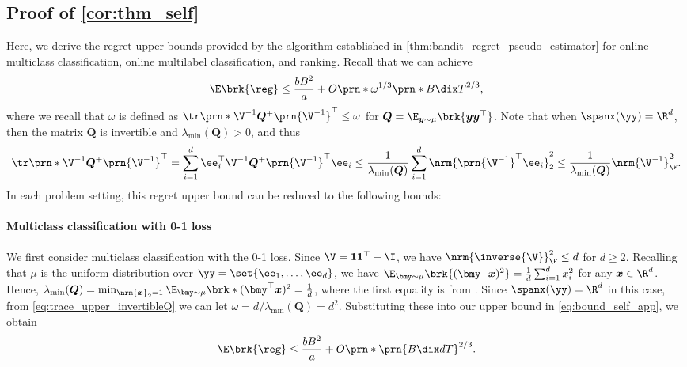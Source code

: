 \subsection{Proof of \cref{cor:thm_self}}\label{app:SELF_upper_discussion_deferred}
Here, we derive the regret upper bounds provided by the algorithm established  
in \cref{thm:bandit_regret_pseudo_estimator}  
for online multiclass classification, online multilabel classification, and ranking.
Recall that 
we can achieve
\begin{equation}\label{eq:bound_self_app}
\E\brk{\reg}
\leq
\frac{bB^2}{a}
+
O\prn*{ \omega^{1/3} \prn*{ B \dix T}^{2/3} },    
\end{equation}
where we recall that $\omega$ is defined as
$
    \tr \prn*{ \V^{-1} \bm{Q}^+ \prn{\V^{-1}}^\top } \leq \omega
$
for $\bm{Q} = \E_{\bm{y} \sim \mu} \brk{ \bm{y} \bm{y}^\top }$.
Note that when $\spanx(\yy) = \R^d$, then the matrix $\bm{Q}$ is invertible and $\lambda_{\min}(\bm{Q}) > 0$, and thus 
\begin{equation}\label{eq:trace_upper_invertibleQ}
    \tr \prn*{ \V^{-1} \bm{Q}^+ \prn{\V^{-1}}^\top }
    =
    \sum_{i=1}^d
    \bm{\ee}_i^\top \V^{-1} \bm{Q}^+ \prn{\V^{-1}}^\top \bm{\ee}_i
    \leq
    \frac{1}{\lambda_{\min}(\bm{Q})}
    \sum_{i=1}^d
    \nrm{ \prn{\V^{-1}}^\top \bm{\ee}_i }_2^2
    \leq 
    \frac{1}{\lambda_{\min}(\bm{Q})}
    \nrm{ \V^{-1} }_{\F}^2
    .
\end{equation}
In each problem setting, this regret upper bound can be reduced to the following bounds:

\paragraph{Multiclass classification with 0-1 loss}
We first consider multiclass classification with the 0-1 loss.
Since $\V=\bm{1}\bm{1}^\top-\I$, we have $\nrm{\inverse{\V}}_\F^2\leq d$ for $d \geq 2$.  
Recalling that $\mu$ is the uniform distribution over $\yy=\set{\bm{\ee}_1,\hdots,\bm{\ee}_d}$, we have  
$
\E_{\bmy\sim\mu}\brk{(\bmy^\top\bm x)^2}=\frac{1}{d}\sum_{i=1}^{d}x_i^2
$
for any $\bm x\in\R^d$.
Hence, $\lambda_{\min}(\bm{Q})=\min_{\nrm{\bm x}_2=1} \E_{\bmy\sim\mu}\brk*{(\bmy^\top\bm x)^2}=\frac{1}{d}$, where the first equality is from \citet[Lemma 2]{comband}.  
Since $\spanx(\yy) = \R^d$ in this case,
from \eqref{eq:trace_upper_invertibleQ} we can let $\omega = d / \lambda_{\min}(\bm{Q}) = d^2$.
Substituting these into our upper bound in \eqref{eq:bound_self_app}, we obtain  
\begin{equation*}
    \E\brk{\reg}\leq\frac{bB^2}{a}+ O \prn*{ \prn{B \dix  d T}^{2/3} }.
\end{equation*}  



